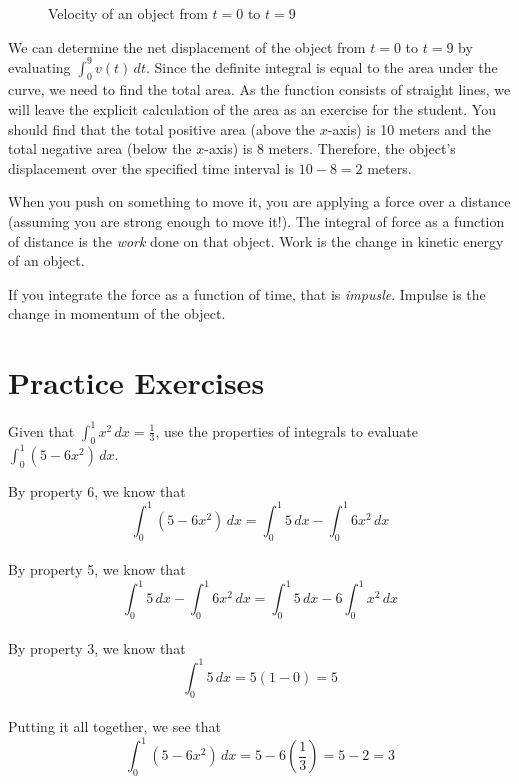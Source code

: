 \begin{figure}[htbp]
	\caption{Velocity of an object from $t=0$ to $t=9$}
	\label{fig:velocity}
\end{figure}

We can determine the net displacement of the object from $t=0$ to $t=9$ by evaluating $\int_{0}^{9}v(t)\,dt$. Since the definite integral is equal to the area under the curve, we need to find the total area. As the function consists of straight lines, we will leave the explicit calculation of the area as an exercise for the student. You should find that the total positive area (above the $x$-axis) is 10 meters and the total negative area (below the $x$-axis) is 8 meters. Therefore, the object's displacement over the specified time interval is $10-8=2$ meters. 

When you push on something to move it, you are applying a force over a distance (assuming you are strong enough to move it!). The integral of force as a function of distance is the \textit{work} done on that object.  Work is the change in kinetic energy of an object. 

If you integrate the force as a function of time, that is \textit{impusle}. Impulse is the change in momentum of the object. 

\section{Practice Exercises}
\begin{Exercise}[label=defint2]
Given that $\int_{0}^{1}x^2\,dx=\frac{1}{3}$, use the properties of integrals to evaluate $\int_{0}^{1}(5-6x^2)\,dx$. 
\end{Exercise}

\begin{Answer}[ref=defint2]
By property 6, we know that $$\int_{0}^{1}(5-6x^2)\,dx=\int_{0}^{1}5\,dx-\int_{0}^{1}6x^2\,dx$$\\
By property 5, we know that $$\int_{0}^{1}5\,dx-\int_{0}^{1}6x^2\,dx=\int_{0}^{1}5\,dx-6\int_{0}^{1}x^2\,dx$$\\
By property 3, we know that $$\int_{0}^{1}5\,dx = 5(1-0) = 5$$\\
Putting it all together, we see that $$\int_{0}^{1}(5-6x^2)\,dx=5-6(\frac{1}{3})=5-2=3$$
\end{Answer}
